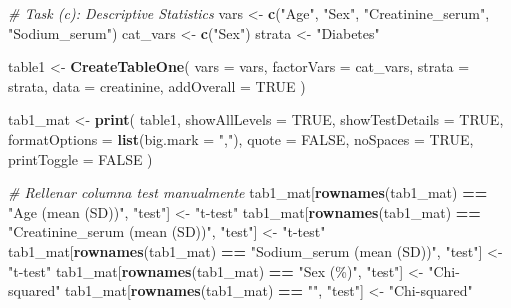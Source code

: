\documentclass[
  12pt,
]{article}
\newenvironment{Shaded}{\begin{snugshade}}{\end{snugshade}}
\newcommand{\AttributeTok}[1]{\textcolor[rgb]{0.13,0.29,0.53}{#1}}
\newcommand{\CommentTok}[1]{\textcolor[rgb]{0.56,0.35,0.01}{\textit{#1}}}
\newcommand{\ConstantTok}[1]{\textcolor[rgb]{0.56,0.35,0.01}{#1}}
\newcommand{\FunctionTok}[1]{\textcolor[rgb]{0.13,0.29,0.53}{\textbf{#1}}}
\newcommand{\NormalTok}[1]{#1}
\newcommand{\OtherTok}[1]{\textcolor[rgb]{0.56,0.35,0.01}{#1}}
\newcommand{\SpecialCharTok}[1]{\textcolor[rgb]{0.81,0.36,0.00}{\textbf{#1}}}
\newcommand{\StringTok}[1]{\textcolor[rgb]{0.31,0.60,0.02}{#1}}
\begin{document}
\begin{Shaded}
\begin{Highlighting}[]
\CommentTok{\# Task (c): Descriptive Statistics}
\NormalTok{vars      }\OtherTok{\textless{}{-}} \FunctionTok{c}\NormalTok{(}\StringTok{"Age"}\NormalTok{, }\StringTok{"Sex"}\NormalTok{, }\StringTok{"Creatinine\_serum"}\NormalTok{, }\StringTok{"Sodium\_serum"}\NormalTok{)}
\NormalTok{cat\_vars  }\OtherTok{\textless{}{-}} \FunctionTok{c}\NormalTok{(}\StringTok{"Sex"}\NormalTok{)}
\NormalTok{strata    }\OtherTok{\textless{}{-}} \StringTok{"Diabetes"}

\NormalTok{table1 }\OtherTok{\textless{}{-}} \FunctionTok{CreateTableOne}\NormalTok{(}
  \AttributeTok{vars       =}\NormalTok{ vars,}
  \AttributeTok{factorVars =}\NormalTok{ cat\_vars,}
  \AttributeTok{strata     =}\NormalTok{ strata,}
  \AttributeTok{data       =}\NormalTok{ creatinine,}
  \AttributeTok{addOverall =} \ConstantTok{TRUE}
\NormalTok{)}

\NormalTok{tab1\_mat }\OtherTok{\textless{}{-}} \FunctionTok{print}\NormalTok{(}
\NormalTok{  table1,}
  \AttributeTok{showAllLevels   =} \ConstantTok{TRUE}\NormalTok{,}
  \AttributeTok{showTestDetails =} \ConstantTok{TRUE}\NormalTok{,}
  \AttributeTok{formatOptions   =} \FunctionTok{list}\NormalTok{(}\AttributeTok{big.mark =} \StringTok{","}\NormalTok{),}
  \AttributeTok{quote           =} \ConstantTok{FALSE}\NormalTok{,}
  \AttributeTok{noSpaces        =} \ConstantTok{TRUE}\NormalTok{,}
  \AttributeTok{printToggle     =} \ConstantTok{FALSE}
\NormalTok{)}

\CommentTok{\# Rellenar columna test manualmente}
\NormalTok{tab1\_mat[}\FunctionTok{rownames}\NormalTok{(tab1\_mat) }\SpecialCharTok{==} \StringTok{"Age (mean (SD))"}\NormalTok{,            }\StringTok{"test"}\NormalTok{] }\OtherTok{\textless{}{-}} \StringTok{"t{-}test"}
\NormalTok{tab1\_mat[}\FunctionTok{rownames}\NormalTok{(tab1\_mat) }\SpecialCharTok{==} \StringTok{"Creatinine\_serum (mean (SD))"}\NormalTok{, }\StringTok{"test"}\NormalTok{] }\OtherTok{\textless{}{-}} \StringTok{"t{-}test"}
\NormalTok{tab1\_mat[}\FunctionTok{rownames}\NormalTok{(tab1\_mat) }\SpecialCharTok{==} \StringTok{"Sodium\_serum (mean (SD))"}\NormalTok{,   }\StringTok{"test"}\NormalTok{] }\OtherTok{\textless{}{-}} \StringTok{"t{-}test"}
\NormalTok{tab1\_mat[}\FunctionTok{rownames}\NormalTok{(tab1\_mat) }\SpecialCharTok{==} \StringTok{"Sex (\%)"}\NormalTok{,                    }\StringTok{"test"}\NormalTok{] }\OtherTok{\textless{}{-}} \StringTok{"Chi{-}squared"}
\NormalTok{tab1\_mat[}\FunctionTok{rownames}\NormalTok{(tab1\_mat) }\SpecialCharTok{==} \StringTok{""}\NormalTok{,                    }\StringTok{"test"}\NormalTok{] }\OtherTok{\textless{}{-}} \StringTok{"Chi{-}squared"}



\end{Highlighting}
\end{Shaded}
\end{document}
